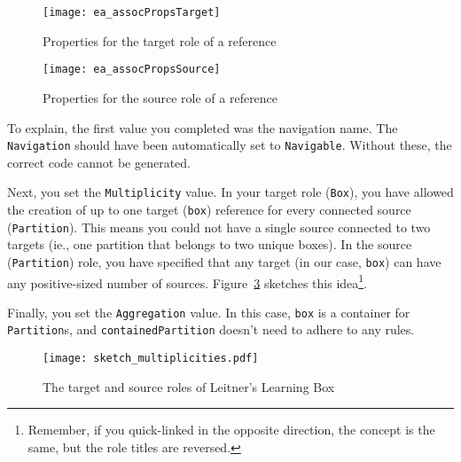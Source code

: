 \begin{itemize}
\vspace{1cm}

\begin{figure}[htbp]
	\centering
	  \texttt{[image: ea\_assocPropsTarget]}\\
	\caption{Properties for the target role of a reference}
	\label{fig:reference_ends}
\end{figure}
\FloatBarrier

\begin{figure}[htbp]
	\centering
    \texttt{[image: ea\_assocPropsSource]}
	\caption{Properties for the source role of a reference}
	\label{fig:sketch_roles}
\end{figure}
\FloatBarrier

\end{itemize}

To explain, the first value you completed was the navigation name. The \texttt{Navigation} should have been automatically set to \texttt{Navigable}. Without these,
the correct code cannot be generated. 

Next, you set the \texttt{Multiplicity} value. In your target role (\texttt{Box}), you have allowed the creation of up to
one target (\texttt{box}) reference for every connected source (\texttt{Partition}). This means you could not have a single source connected to two targets
(ie., one partition that belongs to two unique boxes). In the source (\texttt{Partition}) role, you have specified that any target (in our case, \texttt{box})
can have any positive-sized number of sources. Figure~\ref{fig:sketch_roles} sketches this idea\footnote{Remember, if you quick-linked in the opposite
direction, the concept is the same, but the role titles are reversed.}. 

Finally, you set the \texttt{Aggregation} value. In this case, \texttt{box} is a
container for \texttt{Partition}s, and \texttt{containedPartition} doesn't need to adhere to any rules.

\begin{figure}[htbp]
	\centering
    \texttt{[image: sketch\_multiplicities.pdf]}
	\caption{The target and source roles of Leitner's Learning Box}
	\label{fig:sketch_roles}
\end{figure}
\FloatBarrier

